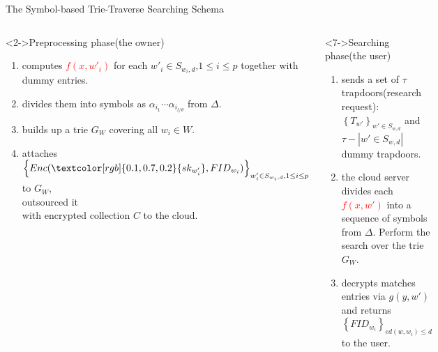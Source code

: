 \documentclass[handout]{beamer}
\begin{document}
\begin{frame}{The Symbol-based Trie-Traverse Searching Schema}
		\begin{columns}
			\begin{exampleblock}<2->{Preprocessing phase(the owner)}
		\begin{enumerate}
			\item<3-> 	computes \textcolor{red}{${f(x,w{'_i})}$} for each ${w{'_i} \in {S_{{w_i},d}}}$,${1 \le i \le p}$ together with dummy entries.
			\item<4-> divides them into symbols as ${\alpha _{{i_1}}} \cdots {\alpha _{{i_{l/\theta }}}}$ from $\Delta$.
			\item<5-> builds up a trie ${G_W}$ covering all ${w_i} \in W$.
			\item<6-> attaches ${\left\{ {Enc(\textcolor[rgb]{0.1,0.7,0.2}{s{k_{w{'_i}}}},FI{D_{{w_i}}})} \right\}_{w{'_i} \in {S_{{w_i},d}},1 \le i \le p}}$ to $G_W$,\\outsourced it\\ with encrypted collection $C$ to the cloud.
			
			
		\end{enumerate}
			\end{exampleblock}
			
			\begin{alertblock}<7->{Searching phase(the user)}
			 \begin{enumerate}
			 	\item<8-> sends a set of $\tau $ trapdoors(research request): ${\left\{ {{T_{w'}}} \right\}_{w' \in {S_{w,d}}}}$ and $\tau  - \left| {w' \in {S_{w,d}}} \right|$ dummy trapdoors.
			 	\item<9-> the cloud server divides each \textcolor{red}{$f(x,w')$} into a sequence of symbols from $\Delta$. Perform the search over the trie $G_W$.
			 	\item<10-> decrypts matches entries via \textcolor[rgb]{0.1,0.7,0.2}{$g(y,w')$} and returns ${\left\{ {FI{D_{{w_i}}}} \right\}_{ed(w,{w_i}) \le d}}$ to the user.
			 \end{enumerate}
			\end{alertblock}
		\end{columns}
\end{frame}
\end{document}

